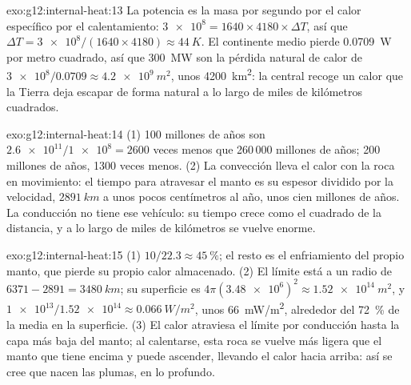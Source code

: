 \begin{solution}{exo:g12:internal-heat:13}
La potencia es la masa por segundo por el calor específico por el
calentamiento: $\num{3e8} = 1640 \times 4180 \times \Delta T$, así que $\Delta T =
\num{3e8}/(1640 \times 4180) \approx \qty{44}{K}$. El continente medio pierde
\qty{0.0709}{W} por metro cuadrado, así que \qty{300}{MW} son la pérdida
natural de calor de $\num{3e8}/0.0709 \approx \qty{4.2e9}{m^2}$, unos
\qty{4200}{km^2}: la central recoge un calor que la Tierra deja escapar de
forma natural a lo largo de miles de kilómetros cuadrados.
\end{solution}

\begin{solution}{exo:g12:internal-heat:14}
(1) 100 millones de años son $\num{2.6e11}/\num{1e8} = 2600$ veces menos que
260\,000 millones de años; 200 millones de años, 1300 veces menos.
(2) La convección lleva el calor con la roca en movimiento: el tiempo para
atravesar el manto es su espesor dividido por la velocidad, $\qty{2891}{km}$
a unos pocos centímetros al año, unos cien millones de años. La conducción no
tiene ese vehículo: su tiempo crece como el cuadrado de la distancia, y a lo
largo de miles de kilómetros se vuelve enorme.
\end{solution}

\begin{solution}{exo:g12:internal-heat:15}
(1) $10/22.3 \approx \qty{45}{\percent}$; el resto es el enfriamiento del
propio manto, que pierde su propio calor almacenado. (2) El límite está a un radio de $6371 - 2891 =
\qty{3480}{km}$; su superficie es $4\pi (\num{3.48e6})^2 \approx
\qty{1.52e14}{m^2}$, y $\num{1e13}/\num{1.52e14} \approx
\qty{0.066}{W/m^2}$, unos \qty{66}{mW/m^2}, alrededor del \qty{72}{\percent}
de la media en la superficie. (3) El calor atraviesa el límite por conducción
hasta la capa más baja del manto; al calentarse, esta roca se vuelve más
ligera que el manto que tiene encima y puede ascender, llevando el calor
hacia arriba: así se cree que nacen las plumas, en lo profundo.
\end{solution}

